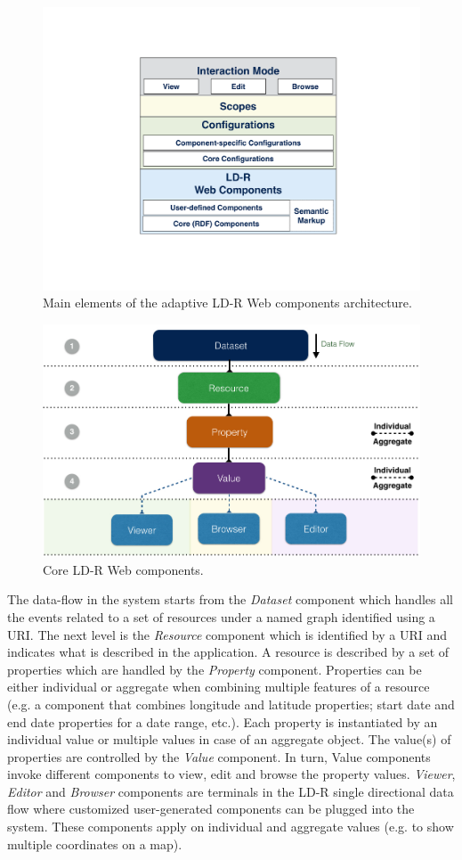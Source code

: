 \documentclass{acm_proc_article-sp}
\begin{document}
\begin{figure}[htb]
	\center
  \includegraphics[width=0.80\linewidth]{images/framework.pdf}
  \caption{Main elements of the adaptive LD-R Web components architecture.}
  \label{fig:framework}
\end{figure}

\begin{figure}[htb]
  \includegraphics[width=1\linewidth]{images/architecture.jpg}
  \caption{Core LD-R Web components.}
  \label{fig:architecture}
\end{figure}

The data-flow in the system starts from the \emph{Dataset} component which handles all the events related to a set of resources under a named graph identified using a URI.
The next level is the \emph{Resource} component which is identified by a URI and indicates what is described in the application.
A resource is described by a set of properties which are handled by the \emph{Property} component. 
Properties can be either individual or aggregate when combining multiple features of a resource (e.g. a component that combines longitude and latitude properties; start date and end date properties for a date range, etc.).
Each property is instantiated by an individual value or multiple values in case of an aggregate object. 
The value(s) of properties are controlled by the \emph{Value} component.
In turn, Value components invoke different components to view, edit and browse the property values.
\emph{Viewer}, \emph{Editor} and \emph{Browser} components are terminals in the LD-R single directional data flow where customized user-generated components can be plugged into the system.
These components apply on individual and aggregate values (e.g. to show multiple coordinates on a map).
\end{document}
